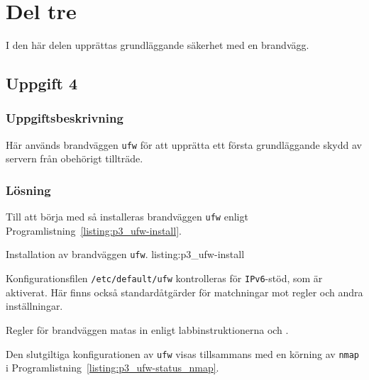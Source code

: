 %
%
%


\section{Del tre}
I den här delen upprättas grundläggande säkerhet med en brandvägg.


\subsection{Uppgift 4}
\subsubsection{Uppgiftsbeskrivning}
Här används brandväggen \texttt{ufw} för att upprätta ett första grundläggande
skydd av servern från obehörigt tillträde.

\subsubsection{Lösning}
Till att börja med så installeras brandväggen \texttt{ufw} enligt 
Programlistning~\ref{listing:p3_ufw-install}.

            {Installation av brandväggen \texttt{ufw}.}
            {listing:p3_ufw-install}

Konfigurationsfilen \texttt{/etc/default/ufw} kontrolleras för
\texttt{IPv6}-stöd, som är aktiverat. Här finns också standardåtgärder för
matchningar mot regler och andra inställningar.

Regler för brandväggen matas in enligt labbinstruktionerna
\cite{dvg001:instruktionerLab5} och \cite{ubuntu:ufw}.

Den slutgiltiga konfigurationen av \texttt{ufw} visas tillsammans med en
körning av \texttt{nmap} i Programlistning~\ref{listing:p3_ufw-status_nmap}.

